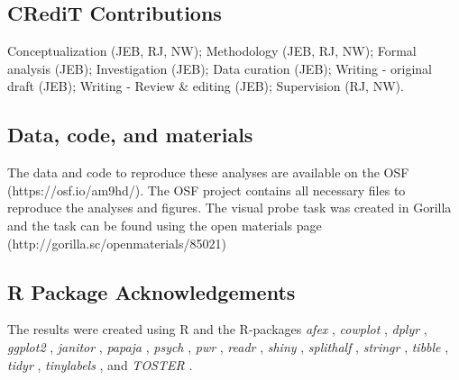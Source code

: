 \documentclass[empirical, authordate]{jote-new-article}
\begin{document}
\subsection{CRediT Contributions}

Conceptualization (JEB, RJ, NW); Methodology (JEB, RJ, NW); Formal analysis (JEB); Investigation (JEB); Data curation (JEB); Writing - original draft (JEB); Writing - Review \& editing (JEB); Supervision (RJ, NW).

\subsection{Data, code, and materials}

The data and code to reproduce these analyses are available on the OSF (https://osf.io/am9hd/). The OSF project contains all necessary files to reproduce the analyses and figures. The visual probe task was created in Gorilla and the task can be found using the open materials page (http://gorilla.sc/openmaterials/85021)

\subsection{R Package Acknowledgements}

The results were created using R \parencite[version 4.1.3][]{RCoreTeam2020} and the R-packages \emph{afex} \parencite[version 1.0.1][]{Singmann2020}, \emph{cowplot} \parencite[version 1.1.1][]{Wilke2019}, \emph{dplyr} \parencite[version 1.0.10][]{Wickham2020}, \emph{ggplot2} \parencite[version 3.3.5][]{Wickham2016}, \emph{janitor} \parencite[version 2.1.0][]{Firke2019}, \emph{papaja} \parencite[version 0.1.1][]{Aust2020}, \emph{psych} \parencite[version 2.2.3][]{Revelle2019}, \emph{pwr} \parencite[version 1.3.0][]{Champely2020}, \emph{readr} \parencite[version 2.1.2][]{Wickham2018}, \emph{shiny} \parencite[version 1.7.1][]{Chang2020}, \emph{splithalf} \parencite[version 0.8.2][]{Parsons2020}, \emph{stringr} \parencite[version 1.4.0][]{Wickham2019}, \emph{tibble} \parencite[version 3.1.6][]{Müller2020}, \emph{tidyr} \parencite[version 1.2.0][]{Wickham2020}, \emph{tinylabels} \parencite[version 0.2.3][]{Barth2022}, and \emph{TOSTER} \parencite[version 0.4.0][]{Lakens2017}.


\end{document}
